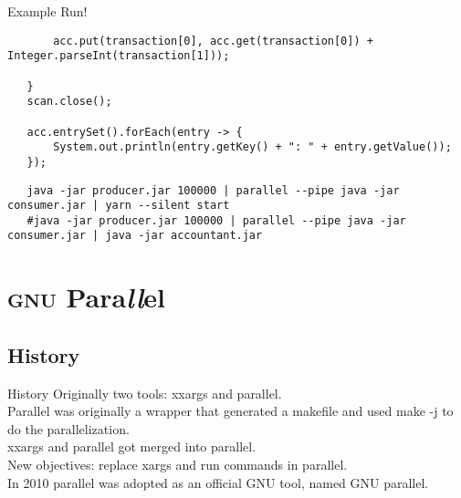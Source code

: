 \begin{frame}[fragile]{Example Run!}
\begin{verbatim}
       acc.put(transaction[0], acc.get(transaction[0]) + Integer.parseInt(transaction[1]));

   }
   scan.close();

   acc.entrySet().forEach(entry -> {
       System.out.println(entry.getKey() + ": " + entry.getValue());
   });
\end{verbatim}
\begin{verbatim}
   java -jar producer.jar 100000 | parallel --pipe java -jar consumer.jar | yarn --silent start
   #java -jar producer.jar 100000 | parallel --pipe java -jar consumer.jar | java -jar accountant.jar
\end{verbatim}
\end{frame}

\section{\texorpdfstring{\textsc{gnu}}{GNU} Para\textit{ll}\/el}
\subsection{History}
\begin{frame}{History}
   Originally two tools: xxargs and parallel. \\
   Parallel was originally a wrapper that generated a makefile and used make -j to do the parallelization.\\
   xxargs and parallel got merged into parallel.\\
   New objectives: replace xargs and run commands in parallel.\\
   In 2010 parallel was adopted as an official GNU tool, named GNU parallel.\\
\end{frame}

